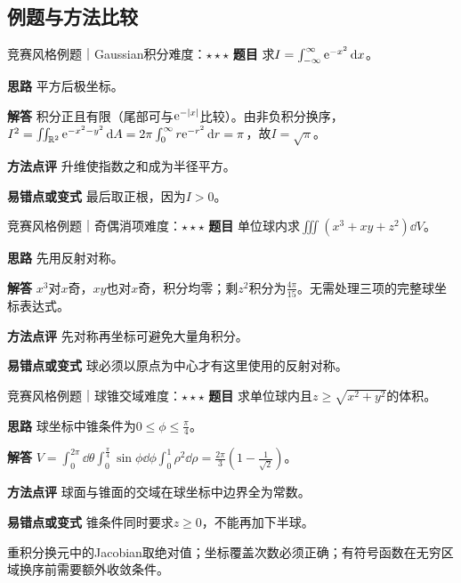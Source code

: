 \subsection{例题与方法比较}
\begin{example}{竞赛风格例题｜Gaussian积分}{难度：$\star\star\star$}
\label{ex:7:13}\textbf{题目} 求$I=\int_{-\infty}^{\infty}\mathrm{e}^{-x^2}\mathop{}\!\mathrm{d} x$。\par
\textbf{思路} 平方后极坐标。\par
\textbf{解答} 积分正且有限（尾部可与$\mathrm{e}^{-|x|}$比较）。由非负积分换序，$I^2=\iint_{\mathbb{R}^2}\mathrm{e}^{-x^2-y^2}\mathop{}\!\mathrm{d} A=2\pi\int_0^\infty r\mathrm{e}^{-r^2}\mathop{}\!\mathrm{d} r=\pi$，故$I=\sqrt\pi$。\par
\textbf{方法点评} 升维使指数之和成为半径平方。\par
\textbf{易错点或变式} 最后取正根，因为$I>0$。
\end{example}
\begin{example}{竞赛风格例题｜奇偶消项}{难度：$\star\star\star$}
\label{ex:7:14}\textbf{题目} 单位球内求$\iiint(x^3+xy+z^2)\dd V$。\par
\textbf{思路} 先用反射对称。\par
\textbf{解答} $x^3$对$x$奇，$xy$也对$x$奇，积分均零；剩$z^2$积分为$\frac{4\pi}{15}$。无需处理三项的完整球坐标表达式。\par
\textbf{方法点评} 先对称再坐标可避免大量角积分。\par
\textbf{易错点或变式} 球必须以原点为中心才有这里使用的反射对称。
\end{example}
\begin{example}{竞赛风格例题｜球锥交域}{难度：$\star\star\star$}
\label{ex:7:15}\textbf{题目} 求单位球内且$z\ge\sqrt{x^2+y^2}$的体积。\par
\textbf{思路} 球坐标中锥条件为$0\le\phi\le\frac{\pi}{4}$。\par
\textbf{解答} $V=\int_0^{2\pi}\dd\theta\int_0^{\frac{\pi}{4}}\sin\phi\dd\phi\int_0^1\rho^2\dd\rho=\frac{2\pi}{3}(1-\frac{1}{\sqrt2})$。\par
\textbf{方法点评} 球面与锥面的交域在球坐标中边界全为常数。\par
\textbf{易错点或变式} 锥条件同时要求$z\ge0$，不能再加下半球。
\end{example}
\begin{warning}重积分换元中的Jacobian取绝对值；坐标覆盖次数必须正确；有符号函数在无穷区域换序前需要额外收敛条件。\end{warning}






